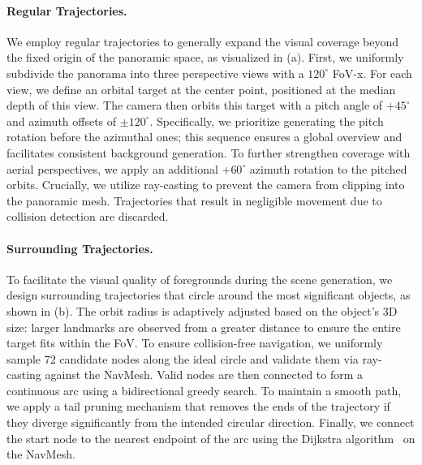 \documentclass{article} %
\begin{document}
\paragraph{Regular Trajectories.}
We employ regular trajectories to generally expand the visual coverage beyond the fixed origin of the panoramic space, as visualized in (a).
First, we uniformly subdivide the panorama into three perspective views with a $120^\circ$ FoV-x.
For each view, we define an orbital target at the center point, positioned at the median depth of this view.
The camera then orbits this target with a pitch angle of $+45^\circ$ and azimuth offsets of $\pm120^\circ$. 
Specifically, we prioritize generating the pitch rotation before the azimuthal ones; this sequence ensures a global overview and facilitates consistent background generation.
To further strengthen coverage with aerial perspectives, we apply an additional $+60^\circ$ azimuth rotation to the pitched orbits.
Crucially, we utilize ray-casting to prevent the camera from clipping into the panoramic mesh.
Trajectories that result in negligible movement due to collision detection are discarded. 

\paragraph{Surrounding Trajectories.} 
To facilitate the visual quality of foregrounds during the scene generation, we design surrounding trajectories that circle around the most significant objects, as shown in (b).
The orbit radius is adaptively adjusted based on the object's 3D size: larger landmarks are observed from a greater distance to ensure the entire target fits within the FoV. 
To ensure collision-free navigation, we uniformly sample 72 candidate nodes along the ideal circle and validate them via ray-casting against the NavMesh.
Valid nodes are then connected to form a continuous arc using a bidirectional greedy search.
To maintain a smooth path, we apply a tail pruning mechanism that removes the ends of the trajectory if they diverge significantly from the intended circular direction.
Finally, we connect the start node to the nearest endpoint of the arc using the Dijkstra algorithm~\cite{dijkstra2022note} on the NavMesh. 
\end{document}
